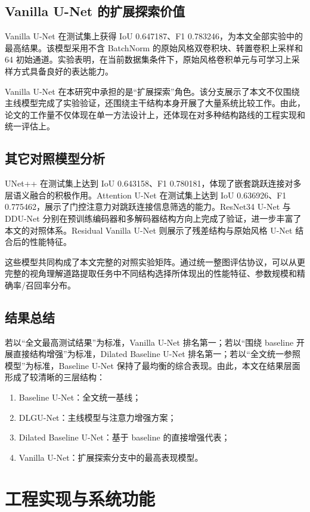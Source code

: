 \documentclass[12pt,a4paper]{ctexart}
\begin{document}
\subsection{Vanilla U-Net 的扩展探索价值}
Vanilla U-Net 在测试集上获得 IoU 0.647187、F1 0.783246，为本文全部实验中的最高结果。该模型采用不含 BatchNorm 的原始风格双卷积块、转置卷积上采样和 64 初始通道。实验表明，在当前数据集条件下，原始风格卷积单元与可学习上采样方式具备良好的表达能力。

Vanilla U-Net 在本研究中承担的是“扩展探索”角色。该分支展示了本文不仅围绕主线模型完成了实验验证，还围绕主干结构本身开展了大量系统比较工作。由此，论文的工作量不仅体现在单一方法设计上，还体现在对多种结构路线的工程实现和统一评估上。

\subsection{其它对照模型分析}
UNet++ 在测试集上达到 IoU 0.643158、F1 0.780181，体现了嵌套跳跃连接对多层语义融合的积极作用。Attention U-Net 在测试集上达到 IoU 0.636926、F1 0.775462，展示了门控注意力对跳跃连接信息筛选的能力。ResNet34 U-Net 与 DDU-Net 分别在预训练编码器和多解码器结构方向上完成了验证，进一步丰富了本文的对照体系。Residual Vanilla U-Net 则展示了残差结构与原始风格 U-Net 结合后的性能特征。

这些模型共同构成了本文完整的对照实验矩阵。通过统一整图评估协议，可以从更完整的视角理解道路提取任务中不同结构选择所体现出的性能特征、参数规模和精确率/召回率分布。

\subsection{结果总结}
若以“全文最高测试结果”为标准，Vanilla U-Net 排名第一；若以“围绕 baseline 开展直接结构增强”为标准，Dilated Baseline U-Net 排名第一；若以“全文统一参照模型”为标准，Baseline U-Net 保持了最均衡的综合表现。由此，本文在结果层面形成了较清晰的三层结构：
\begin{enumerate}[label=\arabic*)]
    \item Baseline U-Net：全文统一基线；
    \item DLGU-Net：主线模型与注意力增强方案；
    \item Dilated Baseline U-Net：基于 baseline 的直接增强代表；
    \item Vanilla U-Net：扩展探索分支中的最高表现模型。
\end{enumerate}

\section{工程实现与系统功能}
\end{document}
